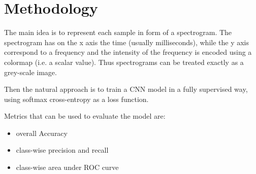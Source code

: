 \documentclass[a4paper]{article}
\begin{document}
\section{Methodology}
The main idea is to represent each sample in form of a spectrogram. The spectrogram has on the x axis the time (usually milliseconds), while the y axis correspond to a frequency and the intensity of the frequency is encoded using a colormap (i.e. a scalar value). Thus spectrograms can be treated exactly as a grey-scale image.

Then the natural approach is to train a CNN model in a fully supervised way, using softmax cross-entropy as a loss function.

Metrics that can be used to evaluate the model are:
\begin{itemize}
    \item overall Accuracy
    \item class-wise precision and recall
    \item class-wise area under ROC curve
\end{itemize}


{}

\end{document}
